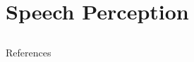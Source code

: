 \documentclass{beamer}
\subtitle[Speech Perception]{Speech Perception}
\newcommand{\suboneone}{}
\begin{document}
  

  \section{Speech Perception}
    \subsection{\suboneone}
      \begin{frame}{\suboneone}

      \end{frame}

      \begin{frame}{References}
      \end{frame}
\end{document}
